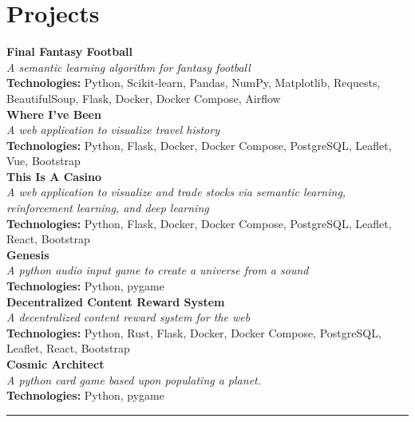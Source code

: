 \documentclass[10pt]{article}%
\newcommand{\projects}[3]{%
    \textbf{#1} \\ %
    \textit{#2} \\ %
    \textbf{Technologies:} #3 \\ %
}
\newcommand{\headerline}{\noindent\rule{\textwidth}{0.4pt}}
\begin{document}
    \section*{\faPuzzlePiece{} Projects}
    \projects{Final Fantasy Football}{A semantic learning algorithm for fantasy football}{Python, Scikit-learn, Pandas, NumPy, Matplotlib, Requests, BeautifulSoup, Flask, Docker, Docker Compose, Airflow}
    \projects{Where I've Been}{A web application to visualize travel history}{Python, Flask, Docker, Docker Compose, PostgreSQL, Leaflet, Vue, Bootstrap}
    \projects{This Is A Casino}{A web application to visualize and trade stocks via semantic learning, reinforcement learning, and deep learning}{Python, Flask, Docker, Docker Compose, PostgreSQL, Leaflet, React, Bootstrap}
    \projects{Genesis}{A python audio input game to create a universe from a sound}{Python, pygame}
    \projects{Decentralized Content Reward System}{A decentralized content reward system for the web}{Python, Rust, Flask, Docker, Docker Compose, PostgreSQL, Leaflet, React, Bootstrap}
    \projects{Cosmic Architect}{A python card game based upon populating a planet.}{Python, pygame}
    \headerline
\end{document}
